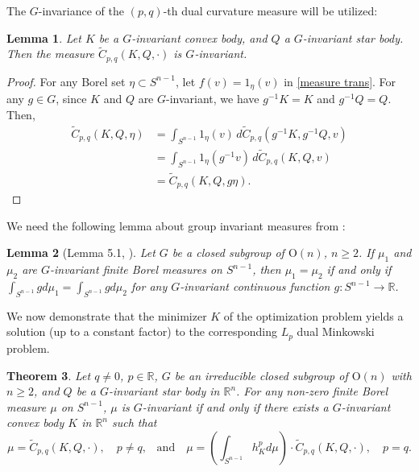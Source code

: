 \documentclass[12pt, reqno]{amsart}
\newtheorem{theorem}{Theorem}[section]
\newtheorem{lemma}[theorem]{Lemma}
\theoremstyle{definition}
\theoremstyle{remark}
\numberwithin{equation}{section}
\newcommand{\Sn}{S^{n-1}}
\newcommand{\On}{\mathrm{O}(n)}
\begin{document}
The $G$-invariance of the $(p, q)$-th dual curvature measure will be utilized:
\begin{lemma}\label{measure G invariant}
	Let $K$ be a $G$-invariant convex body, and $Q$ a $G$-invariant star body. Then the measure $\widetilde{C}_{p,q}(K,Q, \cdot)$ is $G$-invariant.
\end{lemma}

\begin{proof}
For any Borel set $\eta\subset \Sn$,	let $f(v)=1_{\eta}(v)$ in \eqref{measure trans}. For any $g \in G$, since $K$ and $Q$ are $G$-invariant, we have $g^{-1} K = K$ and $g^{-1} Q = Q$.
 Then,
	\begin{align*}
\widetilde{C}_{p,q}(K,Q, \eta)&=	\int_{S^{n-1}} 1_{\eta}(v) \, d\widetilde{C}_{p,q}(g^{-1} K, g^{-1} Q, v)\\
& = \int_{S^{n-1}} 1_{\eta} \left( g^{-1}v \right) \, d\widetilde{C}_{p,q}(K, Q, v)\\
&=\widetilde{C}_{p,q}(K,Q, g\eta).
\end{align*}
\end{proof}


We need  the following lemma  about group invariant measures from \cite{BKMZ group}:

\begin{lemma}[Lemma 5.1, \cite{BKMZ group}]\label{unique}
	Let $G$ be a closed subgroup of $\On$, $n \ge 2$. If $\mu_1$ and $\mu_2$ are $G$-invariant finite Borel measures on $S^{n-1}$, then $\mu_1 = \mu_2$ if and only if $\int_{S^{n-1}} g d\mu_1 = \int_{S^{n-1}} g d\mu_2$ for any $G$-invariant continuous function $g : S^{n-1} \to \mathbb{R}$.
\end{lemma}


We now demonstrate that the minimizer $K$ of the optimization problem yields a solution (up to a constant factor) to the corresponding $L_p$ dual Minkowski problem.


\begin{theorem}\label{closed minkowski}
	Let $q \neq 0$, $p \in \mathbb{R}$, $G$ be an  irreducible closed subgroup of $\mathrm{O}(n)$ with $n \geq 2$, and $Q$ be a $G$-invariant star body in $\mathbb{R}^n$. For any non-zero finite Borel measure $\mu$ on $S^{n-1}$, $\mu$ is $G$-invariant if and only if there exists a $G$-invariant convex body $K$ in $\mathbb{R}^n$ such that
	 $$\mu=\widetilde{C}_{p,q}(K, Q,\cdot),\quad \text{$p\neq q$,}\quad \text{and} \quad \mu=\left( \int_{S^{n-1}}h_{K}^{p}d\mu\right) \cdot \widetilde{C}_{p,q}(K, Q, \cdot),\quad\text{$p=q$}.$$
\end{theorem}
\end{document}
